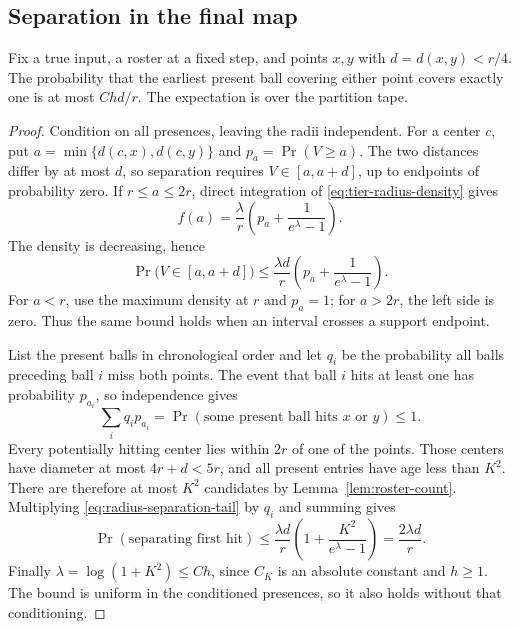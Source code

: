 \subsection{Separation in the final map}

\begin{lemma}\label{lem:first-hit}
Fix a true input, a roster at a fixed step, and points \(x,y\) with
\(d=d(x,y)<r/4\).  The probability that the earliest present ball
covering either point covers exactly one is at most \(Chd/r\).
The expectation is over the partition tape.
\end{lemma}
\begin{proof}
Condition on all presences, leaving the radii independent.  For a center
\(c\), put \(a=\min\{d(c,x),d(c,y)\}\) and
\(p_a=\Pr(V\ge a)\).  The two distances differ by at most \(d\), so
separation requires \(V\in[a,a+d]\), up to endpoints of probability
zero.  If \(r\le a\le2r\), direct integration of
\eqref{eq:tier-radius-density} gives
\[
 f(a)=\frac{\lambda}{r}
       \left(p_a+\frac1{e^\lambda-1}\right).
\]
The density is decreasing, hence
\begin{equation}\label{eq:radius-separation-tail}
 \Pr\bigl(V\in[a,a+d]\bigr)
 \le\frac{\lambda d}{r}
       \left(p_a+\frac1{e^\lambda-1}\right).
\end{equation}
For \(a<r\), use the maximum density at \(r\) and \(p_a=1\);
for \(a>2r\), the left side is zero.  Thus the same bound holds when
an interval crosses a support endpoint.

List the present balls in chronological order and let \(q_i\) be the
probability all balls preceding ball \(i\) miss both points.  The event
that ball \(i\) hits at least one has probability \(p_{a_i}\), so
independence gives
\[
 \sum_i q_i p_{a_i}
 =\Pr(\text{some present ball hits }x\text{ or }y)\le1.
\]
Every potentially hitting center lies within \(2r\) of one of the
points.  Those centers have diameter at most \(4r+d<5r\), and all
present entries have age less than \(K^2\).  There are therefore at
most \(K^2\) candidates by Lemma~\ref{lem:roster-count}.  Multiplying
\eqref{eq:radius-separation-tail} by \(q_i\) and summing gives
\[
 \Pr(\text{separating first hit})
 \le\frac{\lambda d}{r}
       \left(1+\frac{K^2}{e^\lambda-1}\right)
 =\frac{2\lambda d}{r}.
\]
Finally \(\lambda=\log(1+K^2)\le Ch\), since \(C_K\) is an absolute
constant and \(h\ge1\).  The bound is uniform in the conditioned
presences, so it also holds without that conditioning.
\end{proof}

